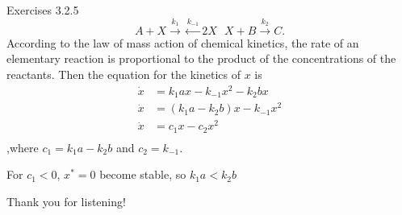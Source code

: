 \documentclass[10pt,aspectratio=43,mathserif,table]{beamer}
\begin{document}
\begin{frame}{Exercises 3.2.5}
	$$
	A+X \xrightarrow{k_1}\xleftarrow{k_{-1}} 2X \ \ \ X+B\xrightarrow{k_2}C.
	$$
	According to the law of mass action of chemical kinetics, the rate of an elementary reaction is proportional to the product of the concentrations of the reactants. Then the equation for the kinetics of $x$ is
	$$
	\begin{aligned}
		\dot{x}&=k_1ax-k_{-1}x^2-k_2bx\\
		\dot{x}&=(k_1a-k_2b)x-k_{-1}x^2\\
		\dot{x}&=c_1x-c_2x^2\\
	\end{aligned}
	$$
	,where $c_1 = k_1a - k_2b$ and $c_2 = k_{-1}$.

	For $c_1 < 0$, $x^* = 0$ become stable, so $k_1a < k_2b$
\end{frame}

 \begin{frame}
 	 \LARGE \centering Thank you for listening!
 \end{frame}
\end{document}
